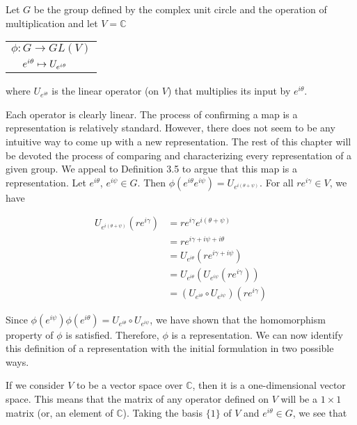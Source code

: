 \begin{example}\end{example}
	Let $G$ be the group defined by the complex unit circle and the operation of multiplication and let $V = \mathbb{C}$ 
	\begin{center}
		 \begin{tabular}{l}$\phi:G\rightarrow GL(V)$\\
				$\hspace{4mm}e^{i\theta}\mapsto U_{e^{i\theta}}$
		\end{tabular}
	\end{center}
	where $U_{e^{i\theta}}$ is the linear operator (on $V$) that multiplies its input by $e^{i\theta}$. 


Each operator is clearly linear. The process of confirming a map is a representation is relatively standard. However, there does not seem to be any intuitive way to come up with a new representation. The rest of this chapter will be devoted the process of comparing and characterizing every representation of a given group. We appeal to Definition 3.5 to argue that this map is a representation. Let $e^{i\theta}$, $e^{i\psi} \in G$. Then $\phi(e^{i\theta} e^{i\psi}) = U_{e^{i(\theta+\psi)}}$. For all $re^{i\gamma} \in V$, we have

	\begin{equation}
		\begin{aligned}
			U_{e^{i(\theta+\psi)}}(re^{i\gamma}) &= re^{i\gamma}  e^{i(\theta+\psi)} \\
										&= re^{i\gamma + i\psi + i\theta} \\
										&= U_{e^{i\theta}}(re^{i\gamma + i\psi}) \\
										&= U_{e^{i\theta}}(U_{e^{i\psi}}(re^{i\gamma})) \\
										&= (U_{e^{i\theta}}\circ U_{e^{i\psi}}) (re^{i\gamma})
		\end{aligned}
	\end{equation}

Since $\phi(e^{i\psi})\phi(e^{i\theta}) = U_{e^{i\theta}}\circ U_{e^{i\psi}}$, we have shown that the homomorphism property of $\phi$ is satisfied. Therefore, $\phi$ is a representation. We can now identify this definition of a representation with the initial formulation in two possible ways.

If we consider $V$ to be a vector space over $\mathbb{C}$, then it is a one-dimensional vector space. This means that the matrix of any operator defined on $V$ will be a $1\times 1$ matrix (or, an element of $\mathbb{C}$). Taking the basis $\{1\}$ of $V$ and $e^{i\theta} \in G$, we see that 

